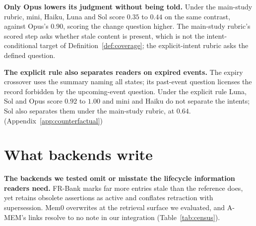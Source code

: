 \documentclass{article}
\newcommand{\claim}[1]{\textbf{#1}}
\begin{document}
\claim{Only Opus lowers its judgment without being told.}
Under the main-study rubric, mini, Haiku, Luna and Sol score $0.35$ to $0.44$ on the same contrast, against Opus's $0.90$, scoring the change question higher. The main-study rubric's scored step asks whether stale content is present, which is not the intent-conditional target of Definition~\ref{def:coverage}; the explicit-intent rubric asks the defined question.

\claim{The explicit rule also separates readers on expired events.}
The expiry crossover uses the summary naming all states; its past-event question licenses the record forbidden by the upcoming-event question. Under the explicit rule Luna, Sol and Opus score $0.92$ to $1.00$ and mini and Haiku do not separate the intents; Sol also separates them under the main-study rubric, at $0.64$. (Appendix~\ref{app:counterfactual})

\section{What backends write}\label{sec:backends}\label{sec:inversion}\label{sec:stores}
\claim{The backends we tested omit or misstate the lifecycle information readers need.}
FR-Bank marks far more entries stale than the reference does, yet retains obsolete assertions as active and conflates retraction with supersession. Mem0 overwrites at the retrieval surface we evaluated, and A-MEM's links resolve to no note in our integration (Table~\ref{tab:census}).
\end{document}
